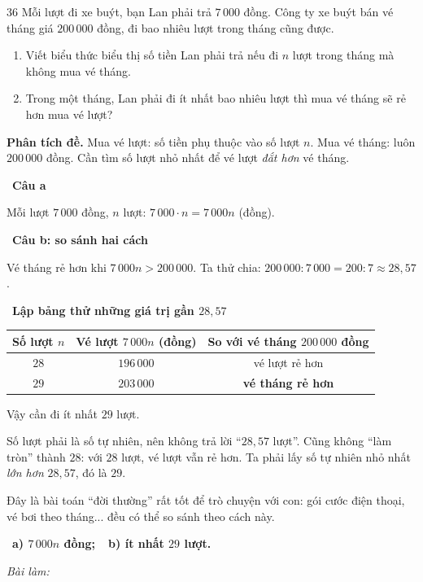 \documentclass[11pt]{article}
\newif\ifsol \solfalse
\providecommand{\AnsWord}{Đáp số}
\newcommand{\ans}[1]{\par\smallskip{\bfseries\color{tmGreen!88!black}\AnsWord:}\ {\bfseries\color{AnsRed}#1}\par}
\newcommand{\probsol}[1]{%
  \begin{lrbox}{\solmeasure}\begin{minipage}{\dimexpr\linewidth-24pt\relax}#1\end{minipage}\end{lrbox}%
  \ifsol
    \begin{solbox}#1\end{solbox}%
  \else
    \setlength{\solht}{\dimexpr\ht\solmeasure+\dp\solmeasure+0.85cm\relax}%
    \ifdim\solht<1.35cm\setlength{\solht}{1.35cm}\fi
    \ifdim\solht>\StudentMaxWork\setlength{\solht}{\StudentMaxWork}\fi
    \begin{tcolorbox}[colback=white,colframe=Line,boxrule=0.8pt,arc=5pt,
      left=8pt,right=8pt,top=4pt,bottom=4pt,height=\solht]{\footnotesize\color{Slate}\itshape\WorkWord}\end{tcolorbox}%
  \fi}
\newlength{\StudentMaxWork}\setlength{\StudentMaxWork}{7.5cm}
\newcommand{\step}[2]{\par\smallskip\noindent{\bfseries\color{tmBlue!85!black}\StepWord~#1.}\ {\bfseries #2}\par\nopagebreak}
\def\WorkWord{Bài làm:}
\def\AnsWord{Đáp số}
\def\StepWord{Bước}
\begin{document}
\begin{probbox}{36}{\relax}
Mỗi lượt đi xe buýt, bạn Lan phải trả $7\,000$ đồng. Công ty xe buýt bán vé tháng giá $200\,000$ đồng, đi bao nhiêu lượt trong tháng cũng được.
\begin{enumerate}[label=\alph*),leftmargin=1.6em,itemsep=1pt,topsep=2pt]
\item Viết biểu thức biểu thị số tiền Lan phải trả nếu đi $n$ lượt trong tháng mà không mua vé tháng.
\item Trong một tháng, Lan phải đi ít nhất bao nhiêu lượt thì mua vé tháng sẽ rẻ hơn mua vé lượt?
\end{enumerate}
\end{probbox}
\probsol{
\textbf{Phân tích đề.} Mua vé lượt: số tiền phụ thuộc vào số lượt $n$. Mua vé tháng: luôn $200\,000$ đồng. Cần tìm số lượt nhỏ nhất để vé lượt \emph{đắt hơn} vé tháng.
\step{1}{Câu a}
Mỗi lượt $7\,000$ đồng, $n$ lượt: $7\,000\cdot n=7\,000n$ (đồng).
\step{2}{Câu b: so sánh hai cách}
Vé tháng rẻ hơn khi $7\,000n>200\,000$. Ta thử chia: $200\,000:7\,000=200:7\approx 28{,}57$.
\step{3}{Lập bảng thử những giá trị gần $28{,}57$}
\begin{center}
\begin{tabular}{|c|c|c|}
\hline
\rowcolor{tmBlue!10} Số lượt $n$ & Vé lượt $7\,000n$ (đồng) & So với vé tháng $200\,000$ đồng\\ \hline
$28$ & $196\,000$ & vé lượt rẻ hơn\\ \hline
$29$ & $203\,000$ & \textbf{vé tháng rẻ hơn}\\ \hline
\end{tabular}
\end{center}
Vậy cần đi ít nhất $29$ lượt.
\begin{warnbox}Số lượt phải là số tự nhiên, nên không trả lời ``$28{,}57$ lượt''. Cũng không ``làm tròn'' thành $28$: với $28$ lượt, vé lượt vẫn rẻ hơn. Ta phải lấy số tự nhiên nhỏ nhất \emph{lớn hơn} $28{,}57$, đó là $29$.\end{warnbox}
\begin{parentbox}Đây là bài toán ``đời thường'' rất tốt để trò chuyện với con: gói cước điện thoại, vé bơi theo tháng... đều có thể so sánh theo cách này.\end{parentbox}
\ans{a) $7\,000n$ đồng;\ \ b) ít nhất $29$ lượt.}
}
\end{document}
